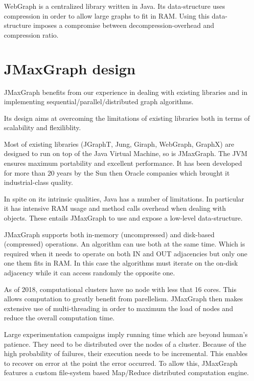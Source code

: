 \documentclass[11pt,a4paper]{article}
\begin{document}
WebGraph is a centralized library written in Java. Its data-structure 
uses compression in order to allow large graphs to fit in RAM. Using this data-structure imposes a compromise between decompression-overhead and compression ratio.

\section{JMaxGraph design}

JMaxGraph benefits from our experience in dealing with existing libraries and in implementing sequential/parallel/distributed graph algorithms.

Its design aims at overcoming the limitations of existing libraries both in terms of scalability and flexiliblity.

Most of existing libraries (JGraphT, Jung, Giraph, WebGraph, GraphX) are designed to run on top of the Java Virtual Machine, so is JMaxGraph. The JVM ensures maximum portability and excellent performance.
It has been developed for more than 20 years by the Sun then Oracle companies which brought it industrial-class quality.

In spite on its intrinsic qualities, Java has a number of limitations. In particular it has intensive RAM usage and method calls overhead when dealing with objects. These entails JMaxGraph
to use and expose a low-level data-structure.

JMaxGraph supports both in-memory (uncompressed) and disk-based (compressed) operations. An algorithm can use both at the same time. Which is required when it needs to operate on both IN and OUT adjacencies but only one one them fits in RAM.
In this case the algorithms must iterate  on the on-disk adjacency while it can access randomly the opposite one.

As of 2018, computational clusters have no node with less that 16 cores. This allows computation to greatly benefit from parellelism.
JMaxGraph then makes extensive use of multi-threading in order to maximum the load of nodes and reduce the overall computation time.

Large experimentation campaigns imply running time which are beyond human's patience. They need to be distributed over the nodes of a cluster. Because of the high probability of failures, their execution needs to be incremental. This enables to recover on error at the point the error occurred. To allow this, JMaxGraph features a custom file-system based Map/Reduce distributed computation engine.
\end{document}
